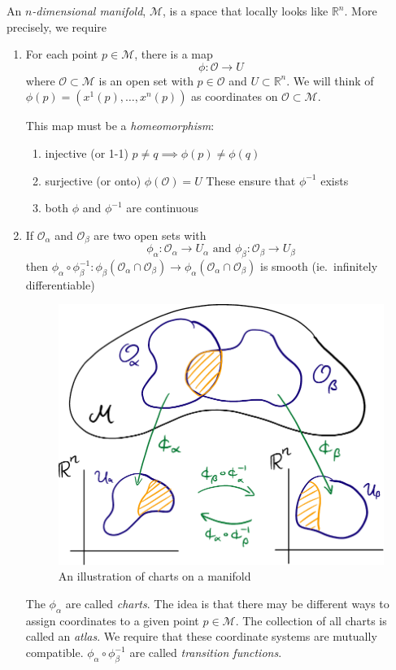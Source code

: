 An \emph{$n$-dimensional manifold}, $\mathcal{M}$, is a space that locally looks like $\mathbb{R}^n$.
More precisely, we require
\begin{enumerate}
  \item For each point $p \in \mathcal{M}$, there is a map
    \begin{equation}
      \phi \colon \mathcal{O} \to U
    \end{equation}
    where $\mathcal{O} \subset \mathcal{M}$ is an open set with $p \in \mathcal{O}$ and $U \subset \mathbb{R}^n$.
    We will think of $\phi(p) = (x^1(p), \dots, x^n(p))$ as coordinates on $\mathcal{O} \subset \mathcal{M}$.

    This map must be a \emph{homeomorphism}:
    \begin{enumerate}
      \item injective (or 1-1) $p \neq q \implies \phi(p) \neq \phi(q)$
      \item surjective (or onto) $\phi(\mathcal{O}) = U$
	These ensure that $\phi^{-1}$ exists
      \item both $\phi$ and $\phi^{-1}$ are continuous
    \end{enumerate}
  \item If $\mathcal{O}_\alpha$ and $\mathcal{O}_\beta$ are two open sets with 
    \begin{equation}
      \phi_\alpha: \mathcal{O}_\alpha \to U_\alpha \text{ and } \phi_\beta: \mathcal{O}_\beta \to U_\beta
    \end{equation}
    then $\phi_\alpha \circ \phi^{-1}_\beta: \phi_\beta(\mathcal{O}_\alpha \cap \mathcal{O}_{\beta}) \to \phi_\alpha (\mathcal{O}_\alpha \cap \mathcal{O}_\beta)$ is smooth (ie.~infinitely differentiable)

    \begin{figure}[htpb]
      \centering
      \includegraphics[width=0.6\linewidth]{lectures/F1.pdf}
      \caption{An illustration of charts on a manifold}
      \label{fig:manifold}
    \end{figure}

    The $\phi_\alpha$ are called \emph{charts}. The idea is that there may be different ways to assign coordinates to a given point $p \in \mathcal{M}$.
    The collection of all charts is called an \emph{atlas}.
    We require that these coordinate systems are mutually compatible.
    $\phi_\alpha \circ \phi_\beta^{-1}$ are called \emph{transition functions}.
\end{enumerate}

